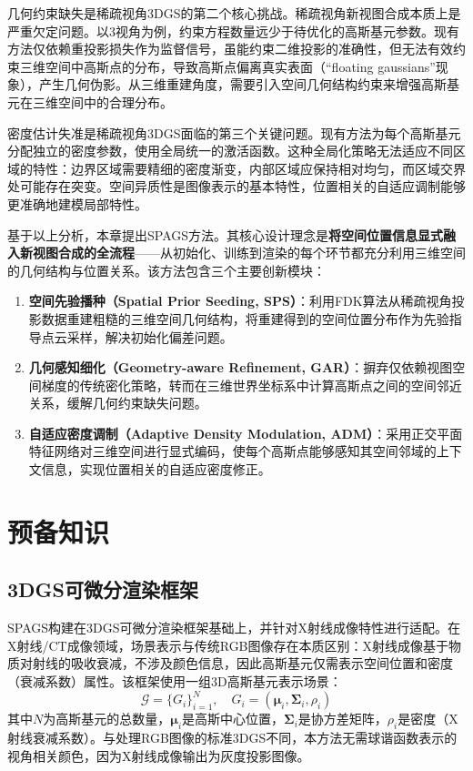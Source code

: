 几何约束缺失是稀疏视角3DGS的第二个核心挑战。稀疏视角新视图合成本质上是严重欠定问题\cite{donoho2006cs}。以3视角为例，约束方程数量远少于待优化的高斯基元参数。现有方法仅依赖重投影损失作为监督信号，虽能约束二维投影的准确性，但无法有效约束三维空间中高斯点的分布，导致高斯点偏离真实表面（“floating gaussians”现象），产生几何伪影\cite{li2024dngaussian,paliwal2024coherentgs}。从三维重建角度，需要引入空间几何结构约束来增强高斯基元在三维空间中的合理分布。

密度估计失准是稀疏视角3DGS面临的第三个关键问题。现有方法为每个高斯基元分配独立的密度参数，使用全局统一的激活函数。这种全局化策略无法适应不同区域的特性：边界区域需要精细的密度渐变，内部区域应保持相对均匀，而区域交界处可能存在突变。空间异质性是图像表示的基本特性，位置相关的自适应调制能够更准确地建模局部特性。

基于以上分析，本章提出SPAGS方法。其核心设计理念是\textbf{将空间位置信息显式融入新视图合成的全流程}——从初始化、训练到渲染的每个环节都充分利用三维空间的几何结构与位置关系。该方法包含三个主要创新模块：

\begin{enumerate}
    \item \textbf{空间先验播种（Spatial Prior Seeding, SPS）}：利用FDK算法从稀疏视角投影数据重建粗糙的三维空间几何结构，将重建得到的空间位置分布作为先验指导点云采样，解决初始化偏差问题。
    \item \textbf{几何感知细化（Geometry-aware Refinement, GAR）}：摒弃仅依赖视图空间梯度的传统密化策略，转而在三维世界坐标系中计算高斯点之间的空间邻近关系，缓解几何约束缺失问题。
    \item \textbf{自适应密度调制（Adaptive Density Modulation, ADM）}：采用正交平面特征网络对三维空间进行显式编码，使每个高斯点能够感知其空间邻域的上下文信息，实现位置相关的自适应密度修正。
\end{enumerate}


\section{预备知识}

\subsection{3DGS可微分渲染框架}

SPAGS构建在3DGS可微分渲染框架基础上\cite{3DGS}，并针对X射线成像特性进行适配。在X射线/CT成像领域，场景表示与传统RGB图像存在本质区别：X射线成像基于物质对射线的吸收衰减，不涉及颜色信息，因此高斯基元仅需表示空间位置和密度（衰减系数）属性。该框架使用一组3D高斯基元表示场景：
\begin{equation}
\mathcal{G} = \{G_i\}_{i=1}^{N}, \quad G_i = (\boldsymbol{\mu}_i, \boldsymbol{\Sigma}_i, \rho_i)
\end{equation}
其中$N$为高斯基元的总数量，$\boldsymbol{\mu}_i$是高斯中心位置，$\boldsymbol{\Sigma}_i$是协方差矩阵，$\rho_i$是密度（X射线衰减系数）。与处理RGB图像的标准3DGS不同，本方法无需球谐函数表示的视角相关颜色，因为X射线成像输出为灰度投影图像。


